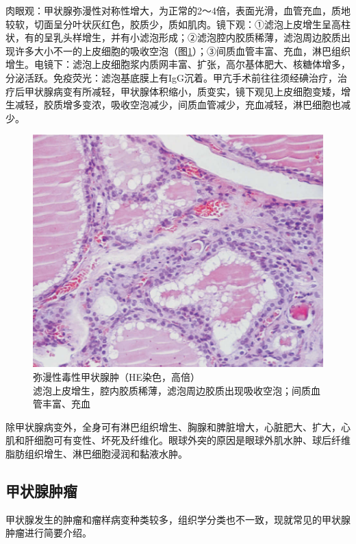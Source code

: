 肉眼观：甲状腺弥漫性对称性增大，为正常的2～4倍，表面光滑，血管充血，质地较软，切面呈分叶状灰红色，胶质少，质如肌肉。镜下观：①滤泡上皮增生呈高柱状，有的呈乳头样增生，并有小滤泡形成；②滤泡腔内胶质稀薄，滤泡周边胶质出现许多大小不一的上皮细胞的吸收空泡（图\ref{fig12-3}）；③间质血管丰富、充血，淋巴组织增生。电镜下：滤泡上皮细胞浆内质网丰富、扩张，高尔基体肥大、核糖体增多，分泌活跃。免疫荧光：滤泡基底膜上有IgG沉着。甲亢手术前往往须经碘治疗，治疗后甲状腺病变有所减轻，甲状腺体积缩小，质变实，镜下观见上皮细胞变矮，增生减轻，胶质增多变浓，吸收空泡减少，间质血管减少，充血减轻，淋巴细胞也减少。

\begin{figure}[!htbp]
 \centering
 \includegraphics{./images/Image00210.jpg}
 \captionsetup{justification=centering}
 \caption{弥漫性毒性甲状腺肿（HE染色，高倍）\\ {\small 滤泡上皮增生，腔内胶质稀薄，滤泡周边胶质出现吸收空泡；间质血管丰富、充血}}
\label{fig12-3}
  \end{figure}

除甲状腺病变外，全身可有淋巴组织增生、胸腺和脾脏增大，心脏肥大、扩大，心肌和肝细胞可有变性、坏死及纤维化。眼球外突的原因是眼球外肌水肿、球后纤维脂肪组织增生、淋巴细胞浸润和黏液水肿。

\subsection{甲状腺肿瘤}

甲状腺发生的肿瘤和瘤样病变种类较多，组织学分类也不一致，现就常见的甲状腺肿瘤进行简要介绍。

